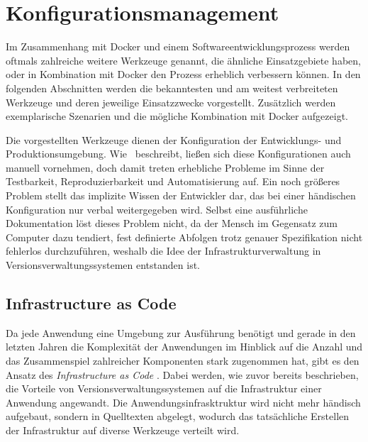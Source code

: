 \chapter{Konfigurationsmanagement}
\label{cha:konfigurationsmanagement}
Im Zusammenhang mit Docker und einem Softwareentwicklungsprozess werden oftmals zahlreiche weitere Werkzeuge genannt, die ähnliche Einsatzgebiete haben, oder in Kombination mit Docker den Prozess erheblich verbessern können.
In den folgenden Abschnitten werden die bekanntesten und am weitest verbreiteten Werkzeuge und deren jeweilige Einsatzzwecke vorgestellt.
Zusätzlich werden exemplarische Szenarien und die mögliche Kombination mit Docker aufgezeigt.

Die vorgestellten Werkzeuge dienen der Konfiguration der Entwicklungs- und Produktionsumgebung.
Wie~\autocite[29\psq]{Wolff201604} beschreibt, ließen sich diese Konfigurationen auch manuell vornehmen, doch damit treten erhebliche Probleme im Sinne der Testbarkeit, Reproduzierbarkeit und Automatisierung auf.
Ein noch größeres Problem stellt das implizite Wissen der Entwickler dar, das bei einer händischen Konfiguration nur verbal weitergegeben wird.
Selbst eine ausführliche Dokumentation löst dieses Problem nicht, da der Mensch im Gegensatz zum Computer dazu tendiert, fest definierte Abfolgen trotz genauer Spezifikation nicht fehlerlos durchzuführen, weshalb die Idee der Infrastrukturverwaltung in Versionsverwaltungssystemen entstanden ist.


\section{Infrastructure as Code}
\label{sec:infrastructureascode}
Da jede Anwendung eine Umgebung zur Ausführung benötigt und gerade in den letzten Jahren die Komplexität der Anwendungen im Hinblick auf die Anzahl und das Zusammenspiel zahlreicher Komponenten stark zugenommen hat, gibt es den Ansatz des \emph{Infrastructure as Code} \autocite{InfrastructureAsCode:online}.
Dabei werden, wie zuvor bereits beschrieben, die Vorteile von Versionsverwaltungssystemen auf die Infrastruktur einer Anwendung angewandt.
Die Anwendungsinfrasktruktur wird nicht mehr händisch aufgebaut, sondern in Quelltexten abgelegt, wodurch das tatsächliche Erstellen der Infrastruktur auf diverse Werkzeuge verteilt wird.

